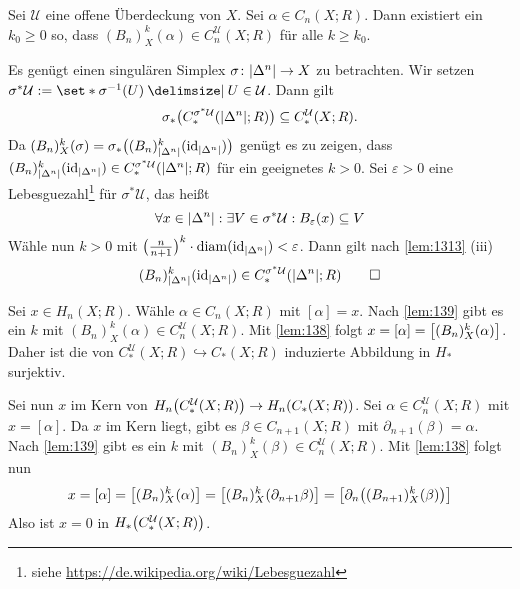 \begin{lemma}[{name=[{Eigenschaft von $(B_n)_X$ in Bezug auf eine offene Überdeckung}]},label=lem:139]
	Sei $\mathcal{U}$ eine offene Überdeckung von $X$. Sei $\alpha\in C_n(X;R)$. 
	Dann existiert ein $k_0\ge 0$ so, dass $(B_n)^{k}_X(\alpha)\in C^\mathcal{U}_n(X;R)$ für alle $k\ge k_0$.
\end{lemma}
\begin{beweis}
	Es genügt einen singulären Simplex $\sigma \colon \abs*{\Delta^n} \to X$ zu betrachten. Wir setzen $\sigma^* \mathcal{U}:= \set*{\sigma ^{-1}(U) \given U \in \mathcal{U}}$. Dann gilt
	\[
		\sigma_* \enbrace[\big]{C_*^{\sigma^*\mathcal{U}} \enbrace*{\abs*{\Delta^n};R}} \subseteq C_*^\mathcal{U}(X;R). 
	\]
	Da $(B_n)_X^k(\sigma) = \sigma_* \enbrace[\big]{(B_n)_{\abs*{\Delta^n}}^k (\id_{\abs*{\Delta^n} })}$ genügt es zu zeigen, dass 
	$(B_n)^k_{\abs*{\Delta^n}} (\id_{\abs*{\Delta^n} }) \in C_*^{\sigma^* \mathcal{U}}\enbrace*{\abs*{\Delta^n};R}$ für ein geeignetes $k>0$. Sei $\varepsilon>0$ eine 
	Lebesguezahl\footnote{siehe \url{https://de.wikipedia.org/wiki/Lebesguezahl}} für $\sigma^*\mathcal{U}$, das heißt 
	\[
		\forall x \in \abs*{\Delta^n} : \exists V \in \sigma^*\mathcal{U} : B_\varepsilon(x) \subseteq V 
	\]
	Wähle nun $k>0$ mit $\enbrace[\big]{\frac{n}{n+1}}^k \cdot \diam(\id_{\abs*{\Delta^n}})< \varepsilon$. Dann gilt nach \autoref{lem:1313} (iii)
	\[
		(B_n)_{\abs*{\Delta^n}}^k (\id_{\abs*{\Delta^n}}) \in C_*^{\sigma^*\mathcal{U}} \enbrace*{\abs*{\Delta^n};R} \qedhere
	\]
\end{beweis}

\begin{beweis}[{name={des Satzes über kleine Simplizes}}]
	Sei $x \in H_n(X;R)$. Wähle $\alpha \in C_n(X;R)$ mit $[\alpha]=x$. 
	Nach \autoref{lem:139} gibt es ein $k$ mit $(B_n)_X^k(\alpha) \in C_n^\mathcal{U}(X;R)$.
	Mit \autoref{lem:138} folgt $x=[\alpha]= \benbrace*{(B_n)_X^k(\alpha)}$. 
	Daher ist die von $C_*^\mathcal{U}(X;R) \hookrightarrow C_*(X;R)$ induzierte Abbildung in $H_*$ surjektiv.

	Sei nun $x$ im Kern von $H_n \enbrace*{C_*^\mathcal{U}(X;R)} \to H_n \enbrace*{C_*(X;R)}$. 
	Sei $\alpha \in C_n^\mathcal{U}(X;R)$ mit $x=[\alpha]$. 
	Da $x$ im Kern liegt, gibt es $\beta \in C_{n+1}(X;R)$ mit $\partial_{n+1}(\beta)=\alpha$. 
	Nach \autoref{lem:139} gibt es ein $k$ mit $(B_n)_X^k(\beta) \in C_n^\mathcal{U}(X;R)$. 
	Mit \autoref{lem:138} folgt nun
	\[
		x = [\alpha] = \benbrace*{(B_n)_X^k(\alpha)} = \benbrace*{(B_n)_X^k(\partial_{n+1} \beta)} = \benbrace*{\partial_n \enbrace*{(B_{n+1})_X^k (\beta)} }   
	\]
	Also ist $x=0$ in $H_* \enbrace*{C_*^\mathcal{U}(X;R)}$.
\end{beweis}

